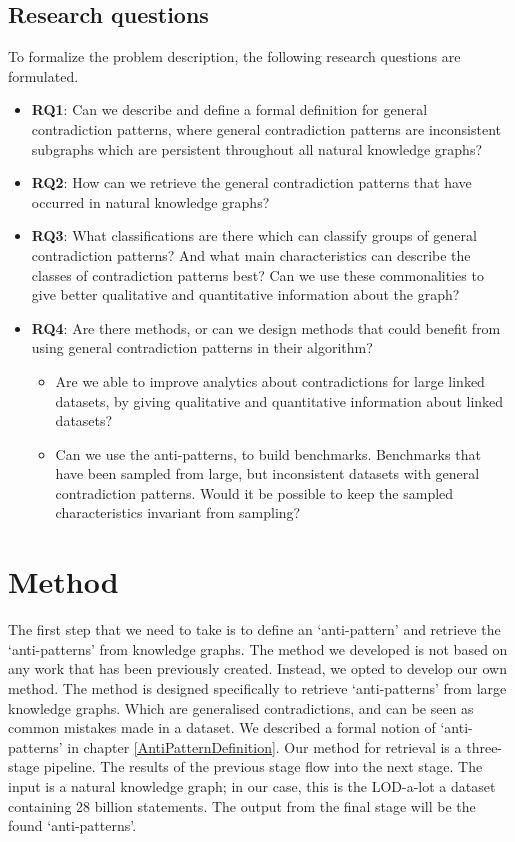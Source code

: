 \documentclass[11pt,letterpaper ,oneside ]{book}
\begin{document}
	\subsection{Research questions}
	To formalize the problem description, the following research questions are formulated.
	\begin{itemize}
		\item \textbf{RQ1}: Can we describe and define a formal definition for general contradiction patterns, where general contradiction patterns are inconsistent subgraphs which are persistent throughout all natural knowledge graphs?
		\item \textbf{RQ2}: How can we retrieve the general contradiction patterns that have occurred in natural knowledge graphs? 
		\item \textbf{RQ3}: What classifications are there which can classify groups of general contradiction patterns? And what main characteristics can describe the classes of contradiction patterns best? Can we use these commonalities to give better qualitative and quantitative information about the graph?
		\item \textbf{RQ4}: Are there methods, or can we design methods that could benefit from using general contradiction patterns in their algorithm? 
		\begin{itemize}
			\item Are we able to improve analytics about contradictions for large linked datasets, by giving qualitative and quantitative information about linked datasets?
			\item Can we use the anti-patterns, to build benchmarks. Benchmarks that have been sampled from large, but inconsistent datasets with general contradiction patterns. Would it be possible to keep the sampled characteristics invariant from sampling?
		\end{itemize}
	\end{itemize}
	
	\section{Method}
	The first step that we need to take is to define an `anti-pattern' and retrieve the `anti-patterns' from knowledge graphs. The method we developed is not based on any work that has been previously created. Instead, we opted to develop our own method. The method is designed specifically to retrieve `anti-patterns' from large knowledge graphs. Which are generalised contradictions, and can be seen as common mistakes made in a dataset. We described a formal notion of `anti-patterns' in chapter \ref{AntiPatternDefinition}. Our method for retrieval is a three-stage pipeline. The results of the previous stage flow into the next stage. The input is a natural knowledge graph; in our case, this is the LOD-a-lot\cite{JavierD:2017} a dataset containing 28 billion statements. The output from the final stage will be the found `anti-patterns'. 
	
\end{document}
